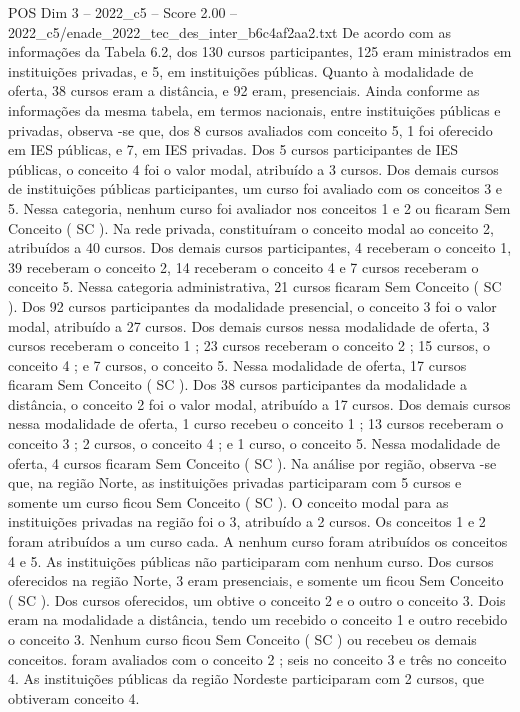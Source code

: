 \begin{textsample}{POS Dim 3 – 2022\_c5 – Score 2.00 – 2022\_c5/enade\_2022\_tec\_des\_inter\_b6c4af2aa2.txt}
De acordo com as informações da Tabela 6.2, dos 130 cursos participantes, 125 eram ministrados em instituições privadas, e 5, em instituições públicas.
Quanto à modalidade de oferta, 38 cursos eram a distância, e 92 eram, presenciais.
Ainda conforme as informações da mesma tabela, em termos nacionais, entre instituições públicas e privadas, observa -se que, dos 8 cursos avaliados com conceito 5, 1 foi oferecido em IES públicas, e 7, em IES privadas.
Dos 5 cursos participantes de IES públicas, o conceito 4 foi o valor modal, atribuído a 3 cursos.
Dos demais cursos de instituições públicas participantes, um curso foi avaliado com os conceitos 3 e 5.
Nessa categoria, nenhum curso foi avaliador nos conceitos 1 e 2 ou ficaram Sem Conceito ( SC ).
Na rede privada, constituíram o conceito modal ao conceito 2, atribuídos a 40 cursos.
Dos demais cursos participantes, 4 receberam o conceito 1, 39 receberam o conceito 2, 14 receberam o conceito 4 e 7 cursos receberam o conceito 5.
Nessa categoria administrativa, 21 cursos ficaram Sem Conceito ( SC ).
Dos 92 cursos participantes da modalidade presencial, o conceito 3 foi o valor modal, atribuído a 27 cursos.
Dos demais cursos nessa modalidade de oferta, 3 cursos receberam o conceito 1 ; 23 cursos receberam o conceito 2 ; 15 cursos, o conceito 4 ; e 7 cursos, o conceito 5.
Nessa modalidade de oferta, 17 cursos ficaram Sem Conceito ( SC ).
Dos 38 cursos participantes da modalidade a distância, o conceito 2 foi o valor modal, atribuído a 17 cursos.
Dos demais cursos nessa modalidade de oferta, 1 curso recebeu o conceito 1 ; 13 cursos receberam o conceito 3 ; 2 cursos, o conceito 4 ; e 1 curso, o conceito 5.
Nessa modalidade de oferta, 4 cursos ficaram Sem Conceito ( SC ).
Na análise por região, observa -se que, na região Norte, as instituições privadas participaram com 5 cursos e somente um curso ficou Sem Conceito ( SC ).
O conceito modal para as instituições privadas na região foi o 3, atribuído a 2 cursos.
Os conceitos 1 e 2 foram atribuídos a um curso cada.
A nenhum curso foram atribuídos os conceitos 4 e 5.
As instituições públicas não participaram com nenhum curso.
Dos cursos oferecidos na região Norte, 3 eram presenciais, e somente um ficou Sem Conceito ( SC ).
Dos cursos oferecidos, um obtive o conceito 2 e o outro o conceito 3.
Dois eram na modalidade a distância, tendo um recebido o conceito 1 e outro recebido o conceito 3.
Nenhum curso ficou Sem Conceito ( SC ) ou recebeu os demais conceitos. foram avaliados com o conceito 2 ; seis no conceito 3 e três no conceito 4.
As instituições públicas da região Nordeste participaram com 2 cursos, que obtiveram conceito 4.

\end{textsample}
